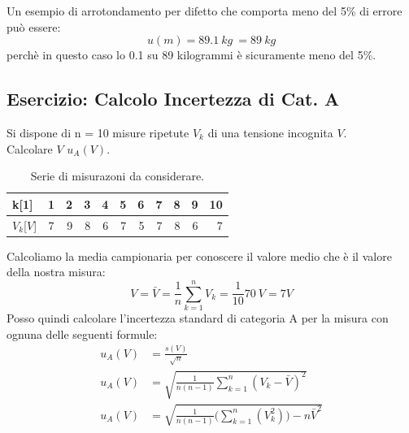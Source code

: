 \documentclass[a4paper,11pt]{report}
\begin{document}
Un esempio di arrotondamento per difetto che comporta meno del 5\% di errore può essere:
$$
  u(m) = 89.1\ kg\ = 89\ kg
$$
perchè in questo caso lo 0.1 su 89 kilogrammi è sicuramente meno del 5\%.
\subsection{Esercizio: Calcolo Incertezza di Cat. A}
Si dispone di n = 10 misure ripetute $V_k$ di una tensione incognita $V$.\\
Calcolare $V$ $u_A(V)$.
\begin{table}[H]
  \caption{Serie di misurazoni da considerare.}
  \label{tab:esIncertezza}

  \begin{center}
    \begin{tabular}{|l|c|r|r|r|r|r|r|r|r|r|}
    \hline
       k[1]       & 1& 2& 3& 4& 5& 6& 7& 8& 9& 10 \\
    \hline
       $V_k$[$V$] & 7& 9& 8& 6& 7& 5& 7& 8& 6& 7 \\
    \hline
    \end{tabular}
  \end{center}
\end{table}
Calcoliamo la media campionaria per conoscere il valore medio che è il valore della nostra misura:
$$
  V = \bar{V} = \frac{1}{n}\sum^n_{k=1}V_k = \frac{1}{10}70\ V = 7 V
$$
Posso quindi calcolare l'incertezza standard di categoria A per la misura con ognuna delle seguenti formule:
\begin{align}
  u_A(V)& = \frac{s(V)}{\sqrt{n}} \label{incA:1}\\
  u_A(V)& = \sqrt{\frac{1}{n(n-1)}\sum^n_{k=1}(V_k-\bar{V})^2} \label{incA:2}\\
  u_A(V)& = \sqrt{\frac{1}{n(n-1)}\Bigg(\sum^n_{k=1}(V_k^2)\Bigg)-n\bar{V}^2} \label{incA:3}
\end{align}
\end{document}
